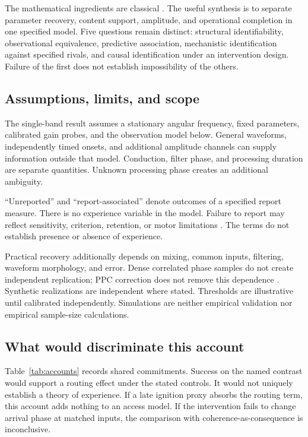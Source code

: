 \documentclass[submission,nolinenumbers]{esj}
\begin{document}
The mathematical ingredients are classical \citep{eisenberg2014,korenberg1996}. The useful synthesis is to separate parameter recovery, content support, amplitude, and operational completion in one specified model. Five questions remain distinct: structural identifiability, observational equivalence, predictive association, mechanistic identification against specified rivals, and causal identification under an intervention design. Failure of the first does not establish impossibility of the others.

\subsection{Assumptions, limits, and scope}\label{sec:limits}
The single-band result assumes a stationary angular frequency, fixed parameters, calibrated gain probes, and the observation model below. General waveforms, independently timed onsets, and additional amplitude channels can supply information outside that model. Conduction, filter phase, and processing duration are separate quantities. Unknown processing phase creates an additional ambiguity.

``Unreported'' and ``report-associated'' denote outcomes of a specified report measure. There is no experience variable in the model. Failure to report may reflect sensitivity, criterion, retention, or motor limitations \citep{shanks2017}. The terms do not establish presence or absence of experience.

Practical recovery additionally depends on mixing, common inputs, filtering, waveform morphology, and error. Dense correlated phase samples do not create independent replication; PPC correction does not remove this dependence \citep{vinck2010}. Synthetic realizations are independent where stated. Thresholds are illustrative until calibrated independently. Simulations are neither empirical validation nor empirical sample-size calculations.

\subsection{What would discriminate this account}\label{sec:accounts}
Table~\ref{tab:accounts} records shared commitments. Success on the named contrast would support a routing effect under the stated controls. It would not uniquely establish a theory of experience. If a late ignition proxy absorbs the routing term, this account adds nothing to an access model. If the intervention fails to change arrival phase at matched inputs, the comparison with coherence-as-consequence is inconclusive.
\end{document}
